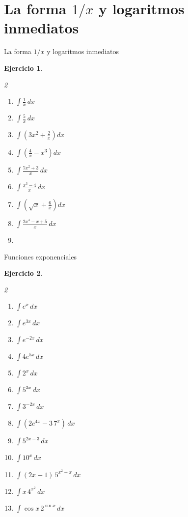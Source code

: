 \documentclass[10pt,aspectratio=169]{beamer}
\newtheorem{Ejer}{Ejercicio}
\begin{document}
\section{La forma $1/x$ y logaritmos inmediatos}
\begin{frame}{La forma $1/x$ y logaritmos inmediatos}
\begin{Ejer}
\begin{multicols}{2}
\begin{enumerate}
\item $\displaystyle \int\frac{1}{x}\,dx$
\item $\displaystyle \int\frac{5}{x}\,dx$
\item $\displaystyle \int\left(3x^2+\frac{2}{x}\right)dx$
\item $\displaystyle \int\left(\frac{4}{x}-x^3\right)dx$
\item $\displaystyle \int\frac{7x^2+3}{x}\,dx$
\item $\displaystyle \int\frac{x^3-4}{x}\,dx$
\item $\displaystyle \int\left(\sqrt{x}+\frac{6}{x}\right)dx$
\item $\displaystyle \int\frac{2x^4-x+5}{x}\,dx$
\item 
\end{enumerate}
\end{multicols}
\end{Ejer}

\end{frame}

\begin{frame}{Funciones exponenciales}
\begin{Ejer}
\begin{multicols}{2}
\begin{enumerate}
\item $\displaystyle \int e^x\,dx$
\item $\displaystyle \int e^{3x}\,dx$
\item $\displaystyle \int e^{-2x}\,dx$
\item $\displaystyle \int 4e^{5x}\,dx$
\item $\displaystyle \int 2^x\,dx$
\item $\displaystyle \int 5^{3x}\,dx$
\item $\displaystyle \int 3^{-2x}\,dx$
\item $\displaystyle \int(2e^{4x}-3\,7^x)\,dx$
\item $\displaystyle \int 5^{2x-3}\,dx$
\item $\displaystyle \int 10^x\,dx$
\item $\displaystyle \int (2x+1)\,5^{x^2+x}\,dx$
\item $\displaystyle \int x\,4^{x^2}\,dx$
\item $\displaystyle \int \cos x\,2^{\sin x}\,dx$
\end{enumerate}
\end{multicols}
\end{Ejer}

\end{frame}
\end{document}
